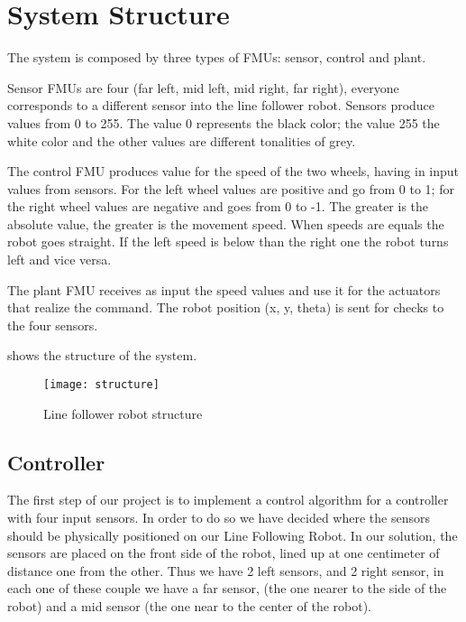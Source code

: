 \chapter{System Structure}

The system is composed by three types of FMUs: sensor, control and plant.

\begin{description}
	\item Sensor FMUs are four (far left, mid left, mid right, far right),
		everyone corresponds to a different sensor into the line
		follower robot. Sensors produce values from 0 to 255. The value
		0 represents the black color; the value 255 the white color and
		the other values are different tonalities of grey.
	\item The control FMU produces value for the speed of the two wheels,
		having in input values from sensors. For the left wheel values
		are positive and go from 0 to 1; for the right wheel values are
		negative and goes from 0 to -1. The greater is the absolute
		value, the greater is the movement speed. When speeds are equals
		the robot goes straight. If the left speed is below than the
		right one the robot turns left and vice versa.
	\item The plant FMU receives as input the speed values and use it for
		the actuators that realize the command. The robot position (x,
		y, theta) is sent for checks to the four sensors.
\end{description}

 shows the structure of the system.

\begin{figure}[htb]
	\texttt{[image: structure]}
	\caption{Line follower robot structure}\label{fig:structure}
\end{figure}

\section{Controller}

The first step of our project is to implement a control algorithm for a
controller with four input sensors. In order to do so we have decided where the
sensors should be physically positioned on our Line Following Robot. In our
solution, the sensors are placed on the front side of the robot, lined up at one
centimeter of distance one from the other. Thus we have 2 left sensors, and 2
right sensor, in each one of these couple we have a far sensor, (the one nearer
to the side of the robot) and a mid sensor (the one near to the center of the
robot).

